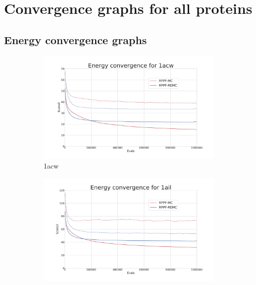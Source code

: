 \chapter{Convergence graphs for all proteins}\label{appendix:convergence-plots}

\section{Energy convergence graphs}

\begin{figure}[ht]
  \begin{subfigure}{0.7\linewidth}
    \centering
    \includegraphics[width=1\linewidth]{Figuras/plots/energy_convergence/energy_convergence_1acw.pdf}
    \caption{1acw}
  \end{subfigure}
%
  \begin{subfigure}{0.7\linewidth}
    \centering
    \includegraphics[width=1\linewidth]{Figuras/plots/energy_convergence/energy_convergence_1ail.pdf}

\end{subfigure}
\end{figure}
